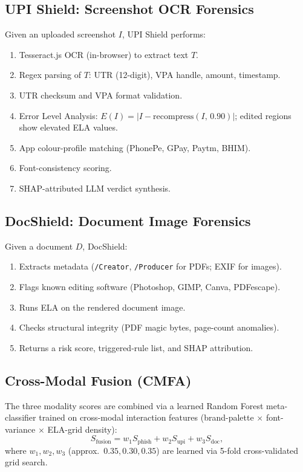 \documentclass[conference]{IEEEtran}
\begin{document}
\subsection{UPI Shield: Screenshot OCR Forensics}
Given an uploaded screenshot $I$, UPI Shield performs:
\begin{enumerate}
\item Tesseract.js OCR (in-browser) to extract text $T$.
\item Regex parsing of $T$: UTR (12-digit), VPA handle, amount, timestamp.
\item UTR checksum and VPA format validation.
\item Error Level Analysis: $E(I)=|I-\mathrm{recompress}(I,\,0.90)|$;
      edited regions show elevated ELA values.
\item App colour-profile matching (PhonePe, GPay, Paytm, BHIM).
\item Font-consistency scoring.
\item SHAP-attributed LLM verdict synthesis.
\end{enumerate}

\subsection{DocShield: Document Image Forensics}
Given a document $D$, DocShield:
\begin{enumerate}
\item Extracts metadata (\texttt{/Creator}, \texttt{/Producer} for
      PDFs; EXIF for images).
\item Flags known editing software (Photoshop, GIMP, Canva, PDFescape).
\item Runs ELA on the rendered document image.
\item Checks structural integrity (PDF magic bytes, page-count
      anomalies).
\item Returns a risk score, triggered-rule list, and SHAP attribution.
\end{enumerate}

\subsection{Cross-Modal Fusion (CMFA)}\label{sec:cmfa}
The three modality scores are combined via a learned Random Forest
meta-classifier trained on cross-modal interaction features
(brand-palette $\times$ font-variance $\times$ ELA-grid density):
\begin{equation}
S_{\text{fusion}} = w_1 S_{\text{phish}} + w_2 S_{\text{upi}}
                  + w_3 S_{\text{doc}},
\label{eq:fusion}
\end{equation}
where $w_1,w_2,w_3$ (approx.\ $0.35,0.30,0.35$) are learned via
5-fold cross-validated grid search.
\end{document}
